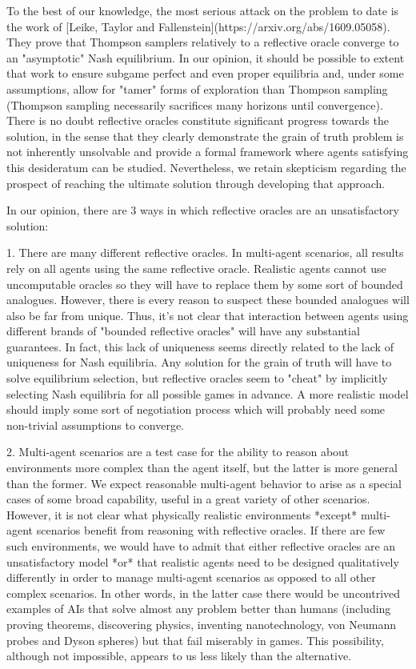\documentclass[a4paper]{article}
\begin{document}
To the best of our knowledge, the most serious attack on the problem to date is the work of [Leike, Taylor and Fallenstein](https://arxiv.org/abs/1609.05058). They prove that Thompson samplers relatively to a reflective oracle converge to an "asymptotic" Nash equilibrium. In our opinion, it should be possible to extent that work to ensure subgame perfect and even proper equilibria and, under some assumptions, allow for "tamer" forms of exploration than Thompson sampling (Thompson sampling necessarily sacrifices many horizons until convergence). There is no doubt reflective oracles constitute significant progress towards the solution, in the sense that they clearly demonstrate the grain of truth problem is not inherently unsolvable and provide a formal framework where agents satisfying this desideratum can be studied. Nevertheless, we retain skepticism regarding the prospect of reaching the ultimate solution through developing that approach.

In our opinion, there are 3 ways in which reflective oracles are an unsatisfactory solution:

1. There are many different reflective oracles. In multi-agent scenarios, all results rely on all agents using the same reflective oracle. Realistic agents cannot use uncomputable oracles so they will have to replace them by some sort of bounded analogues. However, there is every reason to suspect these bounded analogues will also be far from unique. Thus, it's not clear that interaction between agents using different brands of "bounded reflective oracles" will have any substantial guarantees. In fact, this lack of uniqueness seems directly related to the lack of uniqueness for Nash equilibria. Any solution for the grain of truth will have to solve equilibrium selection, but reflective oracles seem to "cheat" by implicitly selecting Nash equilibria for all possible games in advance. A more realistic model should imply some sort of negotiation process which will probably need some non-trivial assumptions to converge.

2. Multi-agent scenarios are a test case for the ability to reason about environments more complex than the agent itself, but the latter is more general than the former. We expect reasonable multi-agent behavior to arise as a special cases of some broad capability, useful in a great variety of other scenarios. However, it is not clear what physically realistic environments *except* multi-agent scenarios benefit from reasoning with reflective oracles. If there are few such environments, we would have to admit that either reflective oracles are an unsatisfactory model *or* that realistic agents need to be designed qualitatively differently in order to manage multi-agent scenarios as opposed to all other complex scenarios. In other words, in the latter case there would be uncontrived examples of AIs that solve almost any problem better than humans (including proving theorems, discovering physics, inventing nanotechnology, von Neumann probes and Dyson spheres) but that fail miserably in games. This possibility, although not impossible, appears to us less likely than the alternative.
\end{document}

